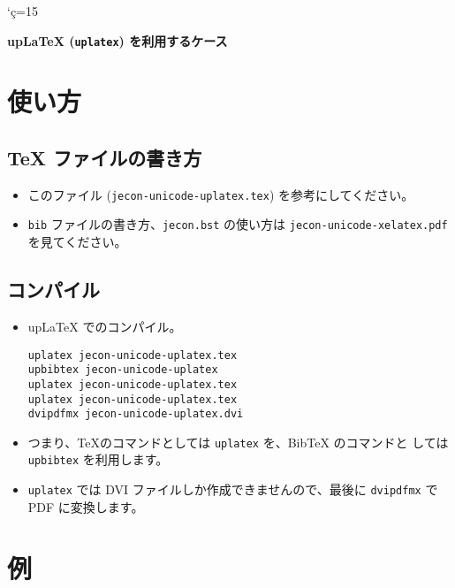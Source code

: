 \documentclass[a4j,10pt]{ujarticle}
\begin{document}
\kcatcode`ç=15%

\begin{flushleft}
 {\Large \textbf{upLaTeX (\texttt{uplatex}) を利用するケース}}
\end{flushleft}

\vspace{1em}

\section{使い方}

\subsection{TeX ファイルの書き方}

\begin{itemize}
 \item このファイル (\texttt{jecon-unicode-uplatex.tex}) を参考にしてください。
 \item \texttt{bib} ファイルの書き方、\texttt{jecon.bst} の使い方は
       \texttt{jecon-unicode-xelatex.pdf} を見てください。
\end{itemize}

\subsection{コンパイル}

\begin{itemize}
 \item upLaTeX でのコンパイル。
\begin{verbatim}
uplatex jecon-unicode-uplatex.tex
upbibtex jecon-unicode-uplatex
uplatex jecon-unicode-uplatex.tex               
uplatex jecon-unicode-uplatex.tex
dvipdfmx jecon-unicode-uplatex.dvi
\end{verbatim}
 \item つまり、\TeX のコマンドとしては \texttt{uplatex} を、BibTeX のコマンドと
       しては \texttt{upbibtex} を利用します。
 \item \texttt{uplatex} では DVI ファイルしか作成できませんので、最後に
       \texttt{dvipdfmx} で PDF に変換します。
\end{itemize}

\section{例}



\nocite{*}



%

\end{document}
